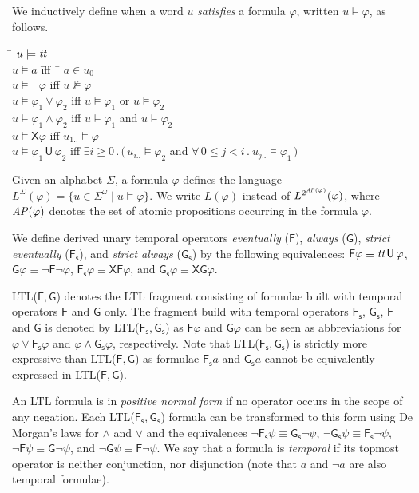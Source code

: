 \documentclass{llncs}
\newcommand{\X}{\mathsf{X}}     \newcommand{\U}{{\,\uU\,}}      \newcommand{\uU}{\mathsf{U}}    \newcommand{\rR}{\mathsf{R}}    \newcommand{\R}{{\,\rR\,}}      \newcommand{\F}{\mathsf{F}}     \newcommand{\G}{\mathsf{G}}     \newcommand{\Fs}{{\F\!\s}}      \newcommand{\Gs}{{\G\s}}        \newcommand{\s}{_\mathsf{s}}
\newcommand{\true}{\textrm{{\it tt}}}
\newcommand{\AP}{\mathit{A\hskip-0.1ex P}}
\newcommand{\suf}[1]{_{#1..}}
\begin{document}
We inductively define when a word $u$ \emph{satisfies} a formula $\varphi$,
written $u\models\varphi$, as follows.
\begin{center}
\begin{tabbing}
  \hspace*{1em} \= $u\models\true$\\
  \> $u\models a$ \hspace*{2.7em} \= iff~ \= $a\in u_0$\\
  \> $u\models\neg\varphi$ \> iff \> $u\not\models\varphi$\\
  \> $u\models\varphi_1\vee\varphi_2$ \> iff \>
  $u\models\varphi_1$ or $u\models\varphi_2$\\
  \> $u\models\varphi_1\wedge\varphi_2$ \> iff \>
  $u\models\varphi_1$ and $u\models\varphi_2$\\
  \> $u\models\X\varphi$ \> iff \> $u\suf{1}\models\varphi$\\
  \> $u\models\varphi_1\U\varphi_2$ \> iff \>
     $\exists i\ge 0\,.\,(\,u\suf{i}\models\varphi_2$ and
     $\forall\, 0\leq j<i\,.~u\suf{j}\models\varphi_1\,)$
\end{tabbing}
\end{center}

Given an alphabet $\Sigma$, a formula $\varphi$ defines the language
$L^\Sigma(\varphi)=\{u\in\Sigma^\omega\mid u\models\varphi\}$. We 
write $L(\varphi)$ instead of $L^{2^{\AP(\varphi)}}(\varphi)$, where
$\AP(\varphi)$ denotes the set of atomic propositions occurring in the
formula $\varphi$.

We define derived unary temporal operators \emph{eventually}
($\F$), \emph{always} ($\G$), \emph{strict eventually} ($\Fs$), and
\emph{strict always} ($\Gs$) by the
following equivalences: $\F\varphi\equiv\true\U\varphi$,
$\G\varphi\equiv\neg\F\neg\varphi$, $\Fs\varphi\equiv\X\F\varphi$, and
$\Gs\varphi\equiv\X\G\varphi$.

LTL($\F,\G$) denotes the LTL fragment consisting of formulae built with
temporal operators $\F$ and $\G$ only.  The fragment build with temporal
operators $\Fs$, $\Gs$, $\F$ and $\G$ is denoted by LTL($\Fs,\Gs$) as
$\F\varphi$ and $\G\varphi$ can be seen as abbreviations for
$\varphi\lor\Fs\varphi$ and $\varphi\land\Gs\varphi$, respectively.  Note
that LTL($\Fs,\Gs$) is strictly more expressive than LTL($\F,\G$) as
formulae $\Fs a$ and $\Gs a$ cannot be equivalently expressed in
LTL($\F,\G$). 

An LTL formula is in \emph{positive normal form} if no operator occurs in
the scope of any negation.  Each LTL($\Fs,\Gs$) formula can be transformed
to this form using De Morgan's laws for $\land$ and $\lor$ and the
equivalences $\neg\Fs\psi\equiv\Gs\neg\psi$, $\neg\Gs\psi\equiv\Fs\neg\psi$,
$\neg\F\psi\equiv\G\neg\psi$, and $\neg\G\psi\equiv\F\neg\psi$. We say that
a formula is \emph{temporal} if its topmost operator is neither conjunction,
nor disjunction (note that $a$ and $\neg a$ are also temporal formulae).
\end{document}
